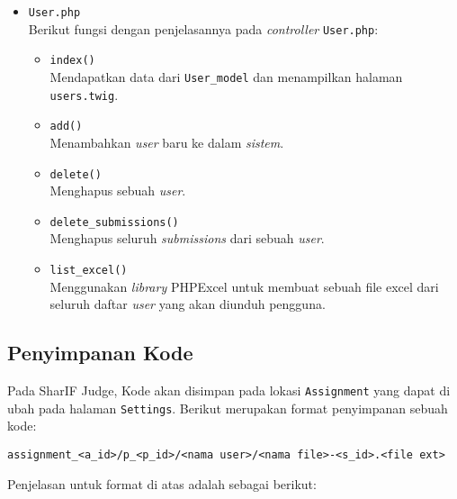 \begin{itemize}
      \item \verb|User.php| \\
            Berikut fungsi dengan penjelasannya pada \textit{controller} \verb|User.php|:

            \begin{itemize}
                  \item \verb|index()| \\
                        Mendapatkan data dari \verb|User_model| dan menampilkan halaman \verb|users.twig|.
                  \item \verb|add()| \\
                        Menambahkan \textit{user} baru ke dalam \textit{sistem}.
                  \item \verb|delete()| \\
                        Menghapus sebuah \textit{user}.
                  \item \verb|delete_submissions()| \\
                        Menghapus seluruh \textit{submissions} dari sebuah \textit{user}.
                  \item \verb|list_excel()| \\
                        Menggunakan \textit{library} PHPExcel untuk membuat sebuah file excel dari seluruh daftar \textit{user} yang akan diunduh pengguna.
            \end{itemize}

\end{itemize}

\subsection{Penyimpanan Kode}
\label{sec:3:1:penyimpanankode}
Pada SharIF Judge, Kode akan disimpan pada lokasi \verb|Assignment| yang dapat di ubah pada halaman \verb|Settings|. Berikut merupakan format penyimpanan sebuah kode:

\begin{center}
      \verb|assignment_<a_id>/p_<p_id>/<nama user>/<nama file>-<s_id>.<file ext>|
\end{center}

Penjelasan untuk format di atas adalah sebagai berikut:


